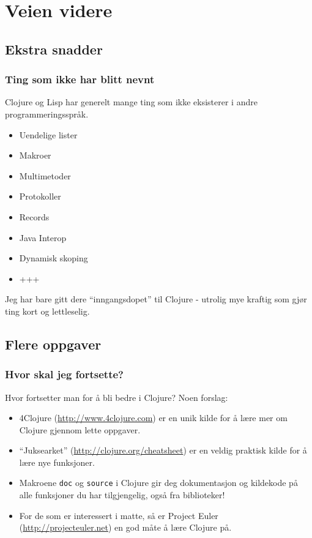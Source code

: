 \documentclass{beamer}
\begin{document}
\section{Veien videre}
\subsection{Ekstra snadder}
\begin{frame}
  \frametitle{Ting som ikke har blitt nevnt}

  Clojure og Lisp har generelt mange ting som ikke eksisterer i andre
  programmeringsspråk.
  \begin{itemize}
  \item Uendelige lister
  \item Makroer
  \item Multimetoder
  \item Protokoller
  \item Records
  \item Java Interop
  \item Dynamisk skoping
  \item +++
  \end{itemize}

  Jeg har bare gitt dere ``inngangsdopet'' til Clojure - utrolig mye kraftig som
  gjør ting kort og lettleselig.
\end{frame}

\subsection{Flere oppgaver}
\begin{frame}
  \frametitle{Hvor skal jeg fortsette?}
  Hvor fortsetter man for å bli bedre i Clojure? Noen forslag:
  \begin{itemize}
  \item<+-> 4Clojure (\url{http://www.4clojure.com}) er en unik kilde for å
    lære mer om Clojure gjennom lette oppgaver.
  \item<+-> ``Juksearket'' (\url{http://clojure.org/cheatsheet}) er en veldig
    praktisk kilde for å lære nye funksjoner.
  \item<+-> Makroene {\tt doc} og {\tt source} i Clojure gir deg dokumentasjon
    og kildekode på alle funksjoner du har tilgjengelig, også fra biblioteker!
  \item<+-> For de som er interessert i matte, så er Project Euler
    (\url{http://projecteuler.net}) en god måte å lære Clojure på.
  \end{itemize}
\end{frame}
\end{document}
